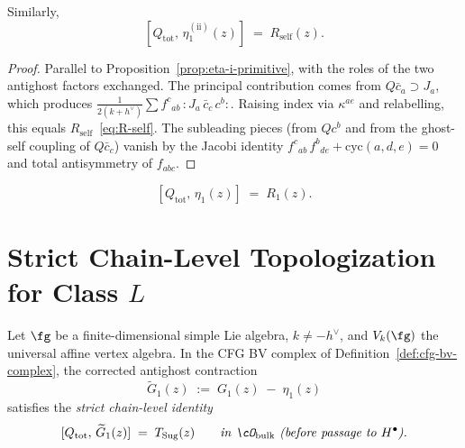 \begin{proposition}
\label{prop:eta-ii-primitive}
\ClaimStatusProvedHere
Similarly,
\begin{equation}\label{eq:Q-eta-ii}
 [Q_{\mathrm{tot}},\,\eta_1^{(\mathrm{ii})}(z)]
 \;=\; R_{\mathrm{self}}(z).
\end{equation}
\end{proposition}

\begin{proof}
Parallel to Proposition~\ref{prop:eta-i-primitive}, with the
roles of the two antighost factors exchanged. The principal
contribution comes from $Q\bar c_a \supset J_a$, which produces
$\tfrac{1}{2(k+h^\vee)}\sum f^c{}_{ab}\,{:}J_a\,\bar c_c\,c^b{:}$.
Raising index via $\kappa^{ae}$ and relabelling, this equals
$R_{\mathrm{self}}$~\eqref{eq:R-self}. The subleading pieces
(from $Q c^b$ and from the ghost-self coupling of
$Q\bar c_c$) vanish by the Jacobi identity
$f^c{}_{ab}\,f^b{}_{de} + \text{cyc}(a,d,e) = 0$ and
total antisymmetry of $f_{abc}$.
\end{proof}

\begin{corollary}[$\eta_1$ is a $Q$-primitive of
$R_1 := R_{\mathrm{ghost}} + R_{\mathrm{self}}$]
\label{cor:eta-primitive}
\ClaimStatusProvedHere
\begin{equation}\label{eq:Q-eta}
 [Q_{\mathrm{tot}},\,\eta_1(z)] \;=\; R_1(z).
\end{equation}
\end{corollary}

\section{Strict Chain-Level Topologization for Class $L$}
\label{sec:strict-chain-level}

\begin{theorem}
\label{thm:sugawara-antighost-primitive-chain-level}
\ClaimStatusProvedHere
Let $\fg$ be a finite-dimensional simple Lie algebra,
$k \ne -h^\vee$, and $V_k(\fg)$ the universal affine vertex
algebra. In the CFG BV complex of
Definition~\ref{def:cfg-bv-complex}, the corrected antighost
contraction
\begin{equation}\label{eq:tilde-G1}
 \widetilde G_1(z) \;:=\; G_1(z) \;-\; \eta_1(z)
\end{equation}
satisfies the \emph{strict chain-level identity}
\begin{equation}\label{eq:strict-chain-identity}
 [Q_{\mathrm{tot}},\,\widetilde G_1(z)]
 \;=\; T_{\mathrm{Sug}}(z)
 \qquad
 \text{\emph{in $\cO_{\mathrm{bulk}}$ (before passage to $H^\bullet$).}}
\end{equation}
\end{theorem}

